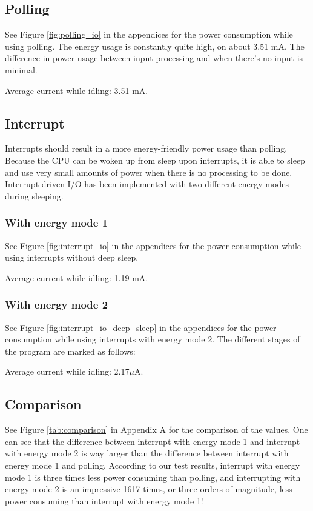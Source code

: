 \subsection{Polling}

See Figure \ref{fig:polling_io} in the appendices for the power consumption while using polling. The energy usage is constantly quite high, on about 3.51 mA. The difference in power usage between input processing and when there's no input is minimal.

Average current while idling: 3.51 mA.

\subsection{Interrupt}

Interrupts should result in a more energy-friendly power usage than polling.
Because the CPU can be woken up from sleep upon interrupts, it is able to sleep and use very small amounts of power when there is no processing to be done. Interrupt driven I/O has been implemented with two different energy modes during sleeping.

\subsubsection{With energy mode 1}

See Figure \ref{fig:interrupt_io} in the appendices for the power consumption while using interrupts without deep sleep.

Average current while idling: 1.19 mA.

\subsubsection{With energy mode 2}

See Figure \ref{fig:interrupt_io_deep_sleep} in the appendices for the power consumption while using interrupts with energy mode 2. The different stages of the program are marked as follows:

Average current while idling: 2.17$\mu$A.

\subsection{Comparison}

See Figure \ref{tab:comparison} in Appendix A for the comparison of the values. One can see that the difference between interrupt with energy mode 1 and interrupt with energy mode 2 is way larger than the difference between interrupt with energy mode 1 and polling. According to our test results, interrupt with energy mode 1 is three times less power consuming than polling, and interrupting with energy mode 2 is an impressive 1617 times, or three orders of magnitude, less power consuming than interrupt with energy mode 1!
